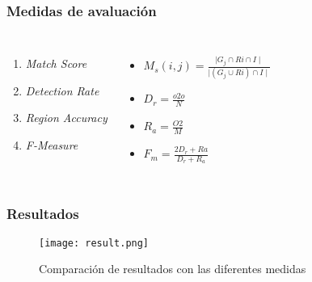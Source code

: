 \documentclass[spanish]{beamer}
\begin{document}
\begin{frame}
\frametitle{Medidas de avaluación}
\begin{columns}[c] %

\begin{enumerate}
\item \textit{Match Score}
\item \textit{Detection Rate}
\item \textit{Region Accuracy}
\item \textit{F-Measure}
\end{enumerate}

\begin{itemize}
\item $ M_s(i,j) = \frac{\mid G_j \cap Ri \cap I \mid }{\mid (G_j \cup  Ri) \cap I \mid }$
\item $D_r = \frac{o2o}{N}$
\item $R_a = \frac{O2}{M}$
\item $F_m = \frac{2D_r + Ra}{D_r + R_a}$
\end{itemize}

\end{columns}
\end{frame}


\begin{frame}
\frametitle{Resultados}
\begin{figure}[H]
    \centering
    \texttt{[image: result.png]}
    \caption{Comparación de resultados con las diferentes medidas}
\end{figure}
\end{frame}


\end{document}
